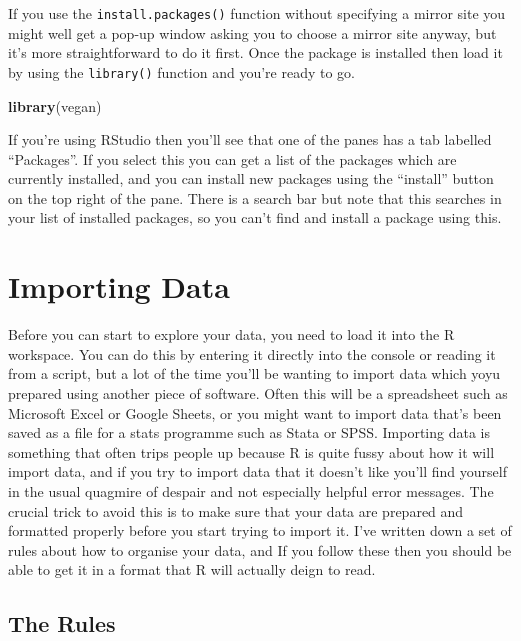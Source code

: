 \documentclass[
]{book}
\newenvironment{Shaded}{\begin{snugshade}}{\end{snugshade}}
\newcommand{\KeywordTok}[1]{\textcolor[rgb]{0.13,0.29,0.53}{\textbf{#1}}}
\newcommand{\NormalTok}[1]{#1}
\begin{document}
If you use the \texttt{install.packages()} function without specifying a mirror site you might well get a pop-up window asking you to choose a mirror site anyway, but it's more straightforward to do it first. Once the package is installed then load it by using the \texttt{library()} function and you're ready to go.

\begin{Shaded}
\begin{Highlighting}[]
\KeywordTok{library}\NormalTok{(vegan)}
\end{Highlighting}
\end{Shaded}

If you're using RStudio then you'll see that one of the panes has a tab labelled ``Packages''. If you select this you can get a list of the packages which are currently installed, and you can install new packages using the ``install'' button on the top right of the pane. There is a search bar but note that this searches in your list of installed packages, so you can't find and install a package using this.

\hypertarget{importing-data}{%
\chapter{Importing Data}\label{importing-data}}

Before you can start to explore your data, you need to load it into the R workspace. You can do this by entering it directly into the console or reading it from a script, but a lot of the time you'll be wanting to import data which yoyu prepared using another piece of software. Often this will be a spreadsheet such as Microsoft Excel or Google Sheets, or you might want to import data that's been saved as a file for a stats programme such as Stata or SPSS. Importing data is something that often trips people up because R is quite fussy about how it will import data, and if you try to import data that it doesn't like you'll find yourself in the usual quagmire of despair and not especially helpful error messages. The crucial trick to avoid this is to make sure that your data are prepared and formatted properly before you start trying to import it. I've written down a set of rules about how to organise your data, and If you follow these then you should be able to get it in a format that R will actually deign to read.

\hypertarget{the-rules}{%
\section{The Rules}\label{the-rules}}
\end{document}
